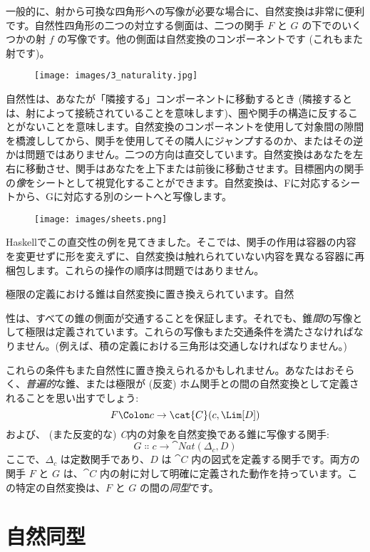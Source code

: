 一般的に、射から可換な四角形への写像が必要な場合に、自然変換は非常に便利です。自然性四角形の二つの対立する側面は、二つの関手 $F$ と $G$ の下でのいくつかの射 $f$ の写像です。他の側面は自然変換のコンポーネントです (これもまた射です)。

\begin{figure}[H]
  \centering
  \texttt{[image: images/3\_naturality.jpg]}
\end{figure}

\noindent
自然性は、あなたが「隣接する」コンポーネントに移動するとき (隣接するとは、射によって接続されていることを意味します)、圏や関手の構造に反することがないことを意味します。自然変換のコンポーネントを使用して対象間の隙間を橋渡ししてから、関手を使用してその隣人にジャンプするのか、またはその逆かは問題ではありません。二つの方向は直交しています。自然変換はあなたを左右に移動させ、関手はあなたを上下または前後に移動させます。目標圏内の関手の\emph{像}をシートとして視覚化することができます。自然変換は、Fに対応するシートから、Gに対応する別のシートへと写像します。

\begin{figure}[H]
  \centering
  \texttt{[image: images/sheets.png]}
\end{figure}

\noindent
Haskellでこの直交性の例を見てきました。そこでは、関手の作用は容器の内容を変更せずに形を変えずに、自然変換は触れられていない内容を異なる容器に再梱包します。これらの操作の順序は問題ではありません。

極限の定義における錐は自然変換に置き換えられています。自然

性は、すべての錐の側面が交通することを保証します。それでも、錐\emph{間}の写像として極限は定義されています。これらの写像もまた交通条件を満たさなければなりません。(例えば、積の定義における三角形は交通しなければなりません。) 

これらの条件もまた自然性に置き換えられるかもしれません。あなたはおそらく、\emph{普遍的}な錐、または極限が (反変) ホム関手との間の自然変換として定義されることを思い出すでしょう: 
\[F \Colon c \to \cat{C}(c, \Lim[D])\]
および、 (また反変的な) \emph{C}内の対象を自然変換である錐に写像する関手: 
\[G \Colon c \to \cat{Nat}(\Delta_c, D)\]
ここで、$\Delta_c$ は定数関手であり、$D$ は $\cat{C}$ 内の図式を定義する関手です。両方の関手 $F$ と $G$ は、$\cat{C}$ 内の射に対して明確に定義された動作を持っています。この特定の自然変換は、$F$ と $G$ の間の\emph{同型}です。

\section{自然同型}

